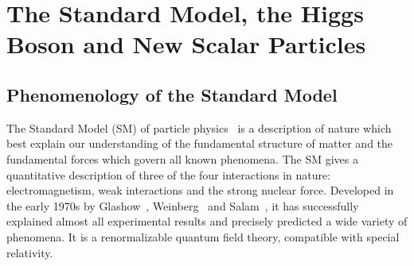 \chapter{The Standard Model, the Higgs Boson and New Scalar Particles}

\section{Phenomenology of the Standard Model}


The Standard Model (SM) of particle physics~\cite{Halzen:1984mc} is a description of nature which best explain  our understanding of the fundamental structure of matter and the fundamental forces which govern all known phenomena. The SM gives a quantitative description of three of the four interactions in nature: electromagnetism, weak interactions and the strong nuclear force.
Developed in the early 1970s by Glashow~\cite{GLASHOW1961579}, Weinberg~\cite{PhysRevLett.19.1264} and Salam~\cite{Salam:1968rm}, it has successfully explained almost
all experimental results and precisely predicted a wide variety of phenomena.
It is a renormalizable quantum field theory, compatible with special relativity.

